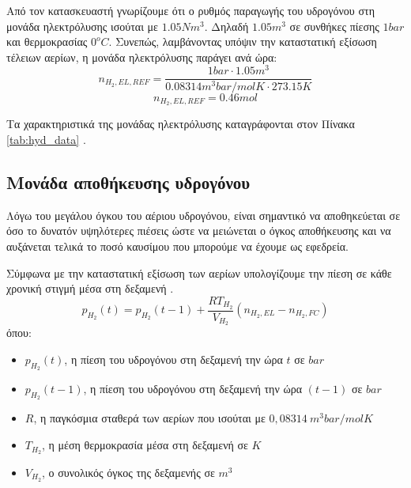 Από τον κατασκευαστή γνωρίζουμε ότι ο ρυθμός παραγωγής του υδρογόνου στη μονάδα ηλεκτρόλυσης ισούται με $1.05 Nm^3$. Δηλαδή $1.05 m^3$ σε συνθήκες πίεσης $1 bar$ και θερμοκρασίας $0^oC$. Συνεπώς, λαμβάνοντας υπόψιν την καταστατική εξίσωση τέλειων αερίων, η μονάδα ηλεκτρόλυσης παράγει ανά ώρα:
\begin{equation}
   n_{Η_2,EL,REF}=\frac{1 bar \cdot 1.05 m^3}{0.08314 m^3bar/molK \cdot 273.15 K} \label{n_H2_EL_REF}
\end{equation}
\begin{equation}
        n_{Η_2,EL,REF}=0.46 mol
\end{equation}

Τα χαρακτηριστικά της μονάδας ηλεκτρόλυσης καταγράφονται στον Πίνακα \ref{tab:hyd_data} \cite{CAU2014820}.

\subsection{Μονάδα αποθήκευσης υδρογόνου}

Λόγω του μεγάλου όγκου του αέριου υδρογόνου, είναι σημαντικό να αποθηκεύεται σε όσο το δυνατόν υψηλότερες πιέσεις ώστε να μειώνεται ο όγκος αποθήκευσης και να αυξάνεται τελικά το ποσό καυσίμου που μπορούμε να έχουμε ως εφεδρεία.

Σύμφωνα με την καταστατική εξίσωση των αερίων υπολογίζουμε την πίεση σε κάθε χρονική στιγμή μέσα στη δεξαμενή \cite{CAU2014820}. 
\begin{equation}
    p_{H_2}(t)=p_{H_2}(t-1)+\frac{RT_{H_2}}{V_{H_2}}(n_{H_2,EL}-n_{H_2,FC}) \label{p_H2}
\end{equation}
όπου:
\begin{itemize}
  \item[] $p_{H_2}(t)$, η πίεση του υδρογόνου στη δεξαμενή την ώρα $t$ σε $bar$
  \\
  \item[] $p_{H_2}(t-1)$, η πίεση του υδρογόνου στη δεξαμενή την ώρα $(t-1)$ σε $bar$
  \\
  \item[] $R$, η παγκόσμια σταθερά των αερίων που ισούται με $0,08314\ m^3bar/molK$
  \\
  \item[] $T_{H_2}$, η μέση θερμοκρασία μέσα στη δεξαμενή σε $K$ 
  \\
  \item[] $V_{H_2}$, ο συνολικός όγκος της δεξαμενής σε $m^3$ 
\end{itemize}

